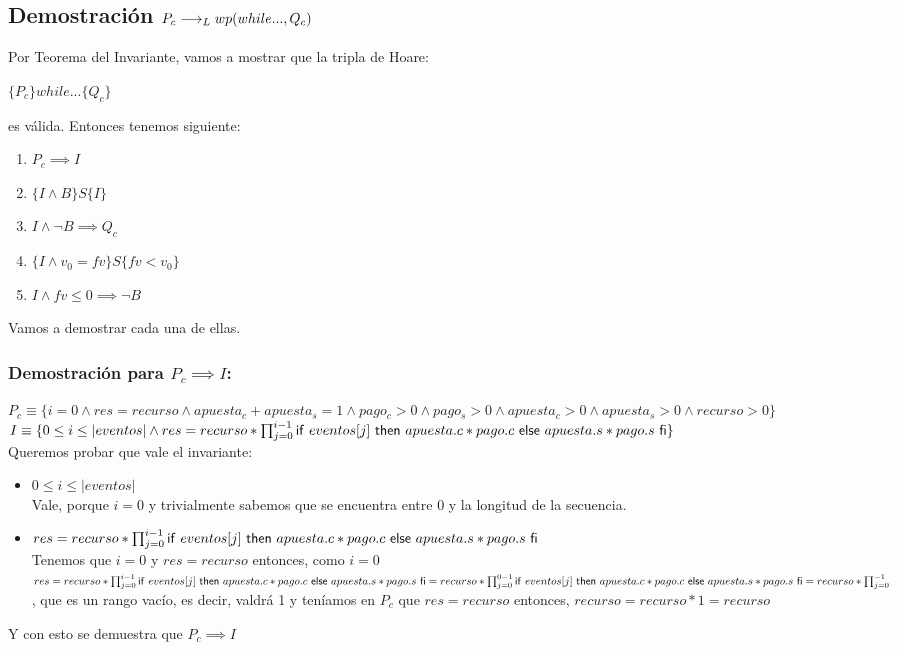 \documentclass[10pt,a4paper]{article}
\begin{document}
\subsection*{Demostración $P_c \longrightarrow _L wp(while..., Q_c)$}
\begin{minipage}[t]{18cm}
Por Teorema del Invariante, vamos a mostrar que la tripla de Hoare:
\begin{center}
	$\{P_c\} while...\{Q_c\}$
\end{center}
es válida. Entonces tenemos siguiente:
\begin{enumerate}
	\item $P_c \implies I$
	\item $\{I\land B\}S\{I\}$
	\item $I \land \neg B \implies Q_c$
	\item $\{I\land v_{0}=fv\}S\{fv<v_{0}\}$
	\item $I\land fv \leq 0 \implies \neg B$
\end{enumerate}
Vamos a demostrar cada una de ellas.
\subsubsection*{Demostración para $P_c \implies I$:}
$P_c \equiv \{i = 0 \land res = recurso \land apuesta_c + apuesta_s = 1 \land pago_c > 0 \land pago_s > 0 \land apuesta_c > 0 \land apuesta_s > 0 \land recurso > 0\}$ \\
$I \equiv \{ 0 \leq i \leq |eventos| \land res = recurso * \prod_{j = 0}^{i - 1} \mathsf{if}\ eventos[j]\ \mathsf{then}\ apuesta.c *pago.c\ \mathsf{else}\ apuesta.s * pago.s\ \mathsf{fi}\}$ \\
Queremos probar que vale el invariante:
\begin{itemize}
	\item $0 \leq i \leq |eventos|$ \\ Vale, porque $i = 0$ y trivialmente sabemos que se encuentra entre 0 y la longitud de la secuencia.
	\item $res = recurso * \prod_{j = 0}^{i - 1} \mathsf{if}\ eventos[j]\ \mathsf{then}\ apuesta.c *pago.c\ \mathsf{else}\ apuesta.s * pago.s\ \mathsf{fi}$ \\ Tenemos que $i = 0$ y $res = recurso$ entonces, como $i = 0$ \\ 
	$res = recurso * \prod_{j = 0}^{i - 1} \mathsf{if}\ eventos[j]\ \mathsf{then}\ apuesta.c *pago.c\ \mathsf{else}\ apuesta.s * pago.s\ \mathsf{fi} = recurso * \prod_{j = 0}^{0 - 1} \mathsf{if}\ eventos[j]\ \mathsf{then}\ apuesta.c *pago.c\ \mathsf{else}\ apuesta.s * pago.s\ \mathsf{fi} = recurso * \prod_{j = 0}^{-1}$, que es un rango vacío, es decir, valdrá 1 y teníamos en $P_c$ que $res = recurso$ entonces, $recurso = recurso * 1 = recurso$
\end{itemize}
Y con esto se demuestra que $P_c \implies I$

\end{minipage}
\end{document}
